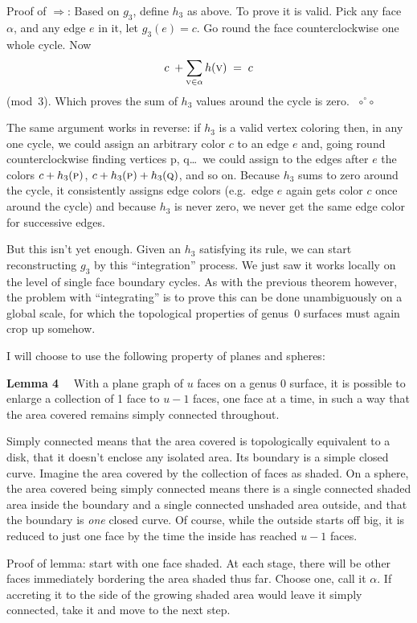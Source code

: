 \documentclass[12pt]{article}
\let\S\scriptstyle
\let\SS\scriptscriptstyle
\let\so\Longrightarrow
\def\qed{ ${\S\circ}\!{}^\circ\!{\S\circ}$}
\begin{document}
Proof of $\so$: Based on $g_3$, define $h_3$ as above. To prove it is valid.
Pick any face $\alpha$, and any edge $e$ in it, let $g_3(e) = c$. Go round
the face counterclockwise one whole cycle. Now
$$
  c \;+ \sum_{{\SS\rm V}\in\alpha} h(\hbox{\sc v}) \;=\; c
$$
(mod~3). Which proves the sum of $h_3$ values around the cycle is zero.~\qed

The same argument works in reverse: if $h_3$ is a valid vertex coloring then,
in any one cycle, we could assign an arbitrary color $c$ to an edge $e$ and,
going round counterclockwise finding vertices {\sc p}, {\sc q}\dots\ we could
assign to the edges after $e$ the colors $c+h_3(\hbox{\sc p})$,
$c+h_3(\hbox{\sc p})+h_3(\hbox{\sc q})$, and so on. Because $h_3$ sums to zero
around the cycle, it consistently assigns edge colors (e.g.\ edge $e$ again
gets color $c$ once around the cycle) and because $h_3$ is never zero, we
never get the same edge color for successive edges.

But this isn't yet enough. Given an $h_3$ satisfying its rule, we can start
reconstructing $g_3$ by this ``integration'' process. We just saw it works
locally on the level of single face boundary cycles. As with the previous
theorem however, the problem with ``integrating'' is to prove this can be done
unambiguously on a global scale, for which the topological properties of
genus~0 surfaces must again crop up somehow.

\vfill\pagebreak
I will choose to use the following property of planes and spheres:

{\bf Lemma 4}$\quad$ With a plane graph of $u$ faces on a genus 0 surface, it is possible to enlarge a collection of 1 face to $u-1$ faces, one face at a time, in such a way that the area covered remains simply connected throughout.

Simply connected means that the area covered is topologically equivalent to a
disk, that it doesn't enclose any isolated area. Its boundary is a simple
closed curve. Imagine the area covered by the collection of faces as shaded.
On a sphere, the area covered being simply connected means there is a single
connected shaded area inside the boundary and a single connected unshaded area
outside, and that the boundary is {\em one\/} closed curve. Of course, while
the outside starts off big, it is reduced to just one face by the time the
inside has reached $u-1$ faces.

Proof of lemma: start with one face shaded. At each stage, there will be
other faces immediately bordering the area shaded thus far. Choose one,
call it $\alpha$. If accreting it to the side of the growing shaded area
would leave it simply connected, take it and move to the next step.
\end{document}

